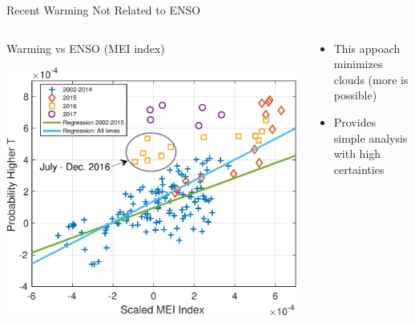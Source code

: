 \documentclass[10pt,t]{beamer}
\begin{document}
\begin{frame}{Recent Warming Not Related to ENSO}
  \begin{columns}
    \begin{column}{0.50\textwidth}
        \vspace{-0.2in}
      \begin{block}{\footnotesize Warming vs ENSO (MEI index)}
        \vspace{-0.1in}
        \begin{center}
          \includegraphics[width=0.85\linewidth]{./Figs_mei/Pdf/mei_vs_highT_prob_with_regr_v2.pdf}
        \end{center}
      \end{block}
    \end{column}

    \begin{column}{0.50\textwidth}
        \vspace{-0.1in}
        \begin{block}{}
        \small
        \begin{itemize}
        \item This appoach minimizes clouds (more is possible)
        \item Provides simple analysis with high certainties
        \end{itemize}
      \end{block}
    \end{column}
  \end{columns}

\end{frame}
\end{document}
